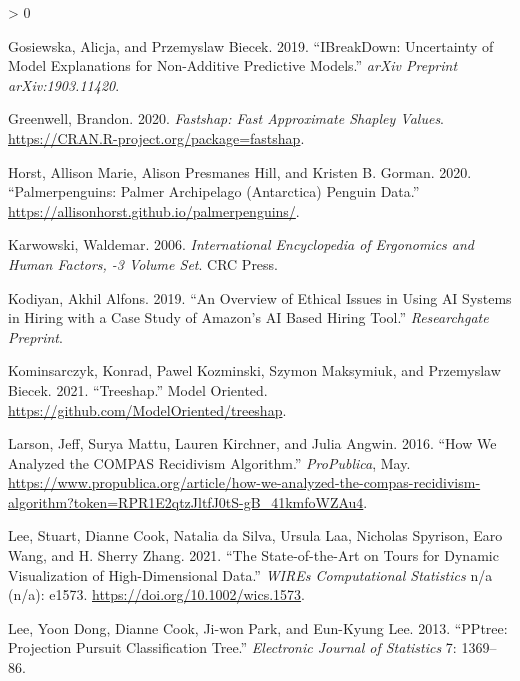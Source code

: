 \documentclass[
]{article}
\newlength{\cslhangindent}
\newenvironment{CSLReferences}[2] %
 {%
  \setlength{\parindent}{0pt}
  \ifodd #1 \everypar{\setlength{\hangindent}{\cslhangindent}}\ignorespaces\fi
  \ifnum #2 > 0
  \setlength{\parskip}{#2\baselineskip}
  \fi
 }%
 {}
\begin{document}
\begin{CSLReferences}{1}{0}
\leavevmode\hypertarget{ref-gosiewska_ibreakdown_2019}{}%
Gosiewska, Alicja, and Przemyslaw Biecek. 2019. {``{IBreakDown}: {Uncertainty} of Model Explanations for Non-Additive Predictive Models.''} \emph{arXiv Preprint arXiv:1903.11420}.

\leavevmode\hypertarget{ref-greenwell_fastshap_2020}{}%
Greenwell, Brandon. 2020. \emph{Fastshap: {Fast} {Approximate} {Shapley} {Values}}. \url{https://CRAN.R-project.org/package=fastshap}.

\leavevmode\hypertarget{ref-horst_palmerpenguins_2020}{}%
Horst, Allison Marie, Alison Presmanes Hill, and Kristen B. Gorman. 2020. {``Palmerpenguins: {Palmer} {Archipelago} ({Antarctica}) Penguin Data.''} \url{https://allisonhorst.github.io/palmerpenguins/}.

\leavevmode\hypertarget{ref-karwowski_international_2006}{}%
Karwowski, Waldemar. 2006. \emph{International {Encyclopedia} of {Ergonomics} and {Human} {Factors}, -3 {Volume} {Set}}. CRC Press.

\leavevmode\hypertarget{ref-kodiyan_overview_2019}{}%
Kodiyan, Akhil Alfons. 2019. {``An Overview of Ethical Issues in Using {AI} Systems in Hiring with a Case Study of {Amazon}'s {AI} Based Hiring Tool.''} \emph{Researchgate Preprint}.

\leavevmode\hypertarget{ref-kominsarczyk_treeshap_2021}{}%
Kominsarczyk, Konrad, Pawel Kozminski, Szymon Maksymiuk, and Przemyslaw Biecek. 2021. {``Treeshap.''} Model Oriented. \url{https://github.com/ModelOriented/treeshap}.

\leavevmode\hypertarget{ref-larson_how_2016}{}%
Larson, Jeff, Surya Mattu, Lauren Kirchner, and Julia Angwin. 2016. {``How {We} {Analyzed} the {COMPAS} {Recidivism} {Algorithm}.''} \emph{ProPublica}, May. \url{https://www.propublica.org/article/how-we-analyzed-the-compas-recidivism-algorithm?token=RPR1E2qtzJltfJ0tS-gB_41kmfoWZAu4}.

\leavevmode\hypertarget{ref-lee_state_2021}{}%
Lee, Stuart, Dianne Cook, Natalia da Silva, Ursula Laa, Nicholas Spyrison, Earo Wang, and H. Sherry Zhang. 2021. {``The State-of-the-Art on Tours for Dynamic Visualization of High-Dimensional Data.''} \emph{WIREs Computational Statistics} n/a (n/a): e1573. \url{https://doi.org/10.1002/wics.1573}.

\leavevmode\hypertarget{ref-lee_pptree_2013}{}%
Lee, Yoon Dong, Dianne Cook, Ji-won Park, and Eun-Kyung Lee. 2013. {``{PPtree}: {Projection} Pursuit Classification Tree.''} \emph{Electronic Journal of Statistics} 7: 1369--86.


\end{CSLReferences}
\end{document}
